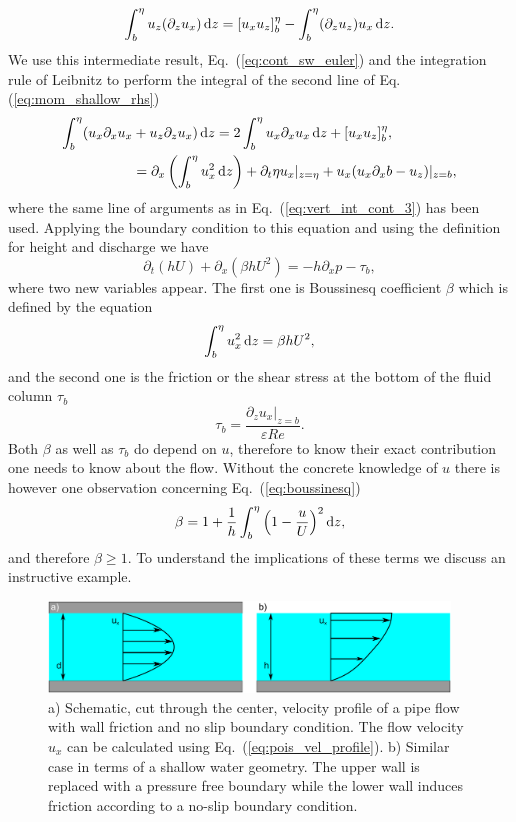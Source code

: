 \begin{equation}
    \int_b^{\eta}u_z(\partial_{z} u_x)\mathop{}\!\mathrm{d} z = [u_x u_z]_b^{\eta} - \int_b^{\eta} (\partial_z u_z) u_x \mathop{}\!\mathrm{d} z.
\end{equation}
We use this intermediate result, Eq.~(\ref{eq:cont_sw_euler}) and the integration rule of Leibnitz to perform the integral of the second line of Eq.(\ref{eq:mom_shallow_rhs}) 
\begin{align}
    \int_b^{\eta}(u_x\partial_x u_x &+ u_z\partial_{z} u_x )\mathop{}\!\mathrm{d} z = 2\int_b^{\eta} u_x\partial_x u_x \mathop{}\!\mathrm{d} z + [u_x u_z]_b^{\eta},\nonumber \\
     &= \partial_x\left(\int_b^{\eta}u_x^2 \mathop{}\!\mathrm{d} z\right) + \partial_t\eta u_x|_{z=\eta} + u_x(u_x\partial_x b - u_z)|_{z=b},
\end{align}
where the same line of arguments as in Eq.~(\ref{eq:vert_int_cont_3}) has been used.
Applying the boundary condition to this equation and using the definition for height and discharge we have
\begin{equation}\label{eq:sw_mom_final}
    \partial_t(hU) + \partial_x(\beta hU^2) = -h\partial_x p - \tau_b,
\end{equation}
where two new variables appear.
The first one is Boussinesq coefficient $\beta$ which is defined by the equation
\begin{equation}\label{eq:boussinesq}
    \int_b^{\eta} u_x^2 \mathop{}\!\mathrm{d} z = \beta h U^2,
\end{equation}
and the second one is the friction or the shear stress at the bottom of the fluid column $\tau_b$
\begin{equation}\label{eq:sw_bot_friction}
    \tau_b = \frac{\partial_z u_x|_{z=b}}{\varepsilon Re}. 
\end{equation}
Both $\beta$ as well as $\tau_b$ do depend on $u$, therefore to know their exact contribution one needs to know about the flow.
Without the concrete knowledge of $u$ there is however one observation concerning Eq.~(\ref{eq:boussinesq})
\begin{equation}\label{eq:beta_lims}
    \beta = 1 + \frac{1}{h}\int_b^{\eta}\left(1 - \frac{u}{U}\right)^2 \mathop{}\!\mathrm{d} z,
\end{equation}
and therefore $\beta \geq 1$.
To understand the implications of these terms we discuss an instructive example.

\begin{figure}
    \centering
    \includegraphics[width=0.95\textwidth]{graphics/Simple_flow.pdf}
    \caption{a) Schematic, cut through the center, velocity profile of a pipe flow with wall friction and no slip boundary condition.
    The flow velocity $u_x$ can be calculated using Eq.~(\ref{eq:pois_vel_profile}).
    b) Similar case in terms of a shallow water geometry. 
    The upper wall is replaced with a pressure free boundary while the lower wall induces friction according to a no-slip boundary condition.
    }
    \label{fig:pois_vel_profile}
\end{figure}
